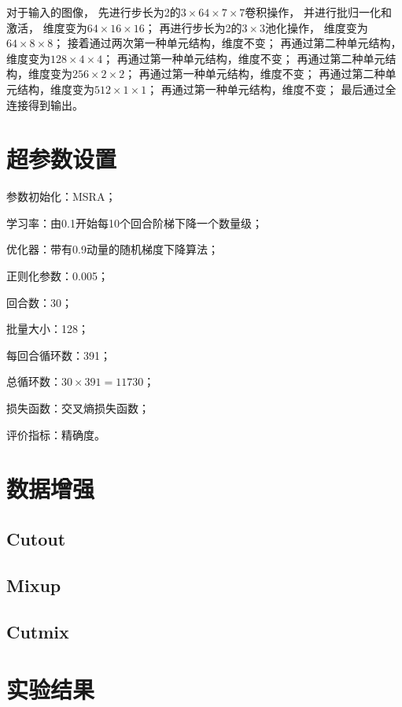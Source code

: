 \documentclass{article}
\begin{document}
对于输入的图像，
先进行步长为2的$3\times64\times7\times7$卷积操作，
并进行批归一化和激活，
维度变为$64\times16\times16$；
再进行步长为2的$3\times3$池化操作，
维度变为$64\times8\times8$；
接着通过两次第一种单元结构，维度不变；
再通过第二种单元结构，维度变为$128\times4\times4$；
再通过第一种单元结构，维度不变；
再通过第二种单元结构，维度变为$256\times2\times2$；
再通过第一种单元结构，维度不变；
再通过第二种单元结构，维度变为$512\times1\times1$；
再通过第一种单元结构，维度不变；
最后通过全连接得到输出。

\section{超参数设置}

参数初始化：MSRA；

学习率：由0.1开始每10个回合阶梯下降一个数量级；

优化器：带有0.9动量的随机梯度下降算法；

正则化参数：0.005；

回合数：30；

批量大小：128；

每回合循环数：391；

总循环数：$ 30 \times 391 = 11730 $；

损失函数：交叉熵损失函数；

评价指标：精确度。

\section{数据增强}

\subsection{Cutout}

\subsection{Mixup}

\subsection{Cutmix}

\section{实验结果}
\end{document}
